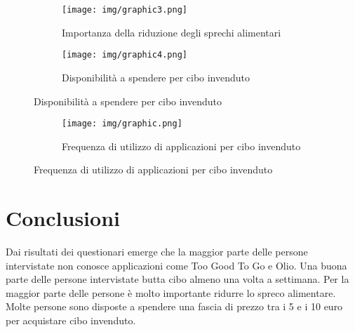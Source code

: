\documentclass{article}
\begin{document}
\begin{figure}[h]
    \centering
    \begin{subfigure}{0.40\textwidth}
        \centering
        \texttt{[image: img/graphic3.png]}
        \caption{Importanza della riduzione degli sprechi alimentari}
    \end{subfigure}
    \hfill
    \begin{subfigure}{0.40\textwidth}
        \centering
        \texttt{[image: img/graphic4.png]}
        \caption{Disponibilità a spendere per cibo invenduto}
    \end{subfigure}
\end{figure}

\begin{figure}[h]
    \centering
    \begin{subfigure}{0.40\textwidth}
        \centering
        \texttt{[image: img/graphic.png]}
        \caption{Frequenza di utilizzo di applicazioni per cibo invenduto}
    \end{subfigure}
\end{figure}

\clearpage
\section{Conclusioni}
Dai risultati dei questionari emerge che la maggior parte delle persone intervistate non conosce applicazioni come Too Good To Go e Olio.
Una buona parte delle persone intervistate butta cibo almeno una volta a settimana.
Per la maggior parte delle persone è molto importante ridurre lo spreco alimentare.
Molte persone sono disposte a spendere una fascia di prezzo tra i 5 e i 10 euro per acquistare cibo invenduto.
\end{document}

